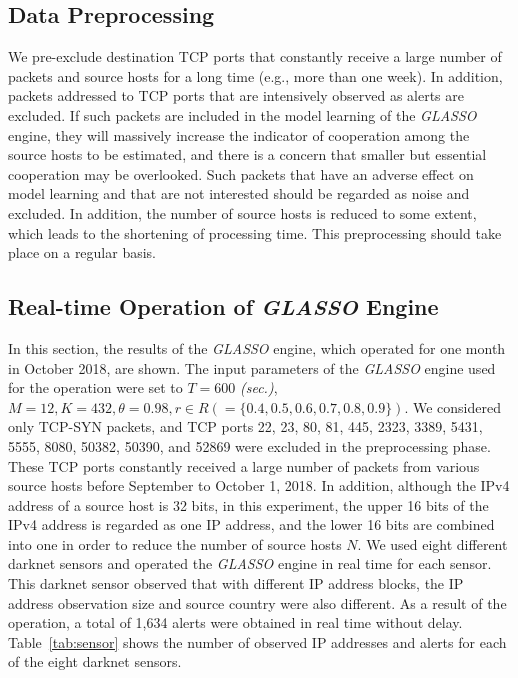 \documentclass[conference]{IEEEtran}
\begin{document}
\subsection{Data Preprocessing}
We pre-exclude destination TCP ports that constantly receive a large number of packets and source hosts for a long time (e.g., more than one week).
In addition, packets addressed to TCP ports that are intensively observed as alerts are excluded.
If such packets are included in the model learning of the \textit{GLASSO} engine, they will massively increase the indicator of cooperation among the source hosts to be estimated, and there is a concern that smaller but essential cooperation may be overlooked.
Such packets that have an adverse effect on model learning and that are not interested should be regarded as noise and excluded.
In addition, the number of source hosts is reduced to some extent, which leads to the shortening of processing time.
This preprocessing should take place on a regular basis.



\subsection{Real-time Operation of \textit{GLASSO} Engine}
\label{Operation}
In this section, the results of the \textit{GLASSO} engine, which operated for one month in October 2018, are shown.
The input parameters of the \textit{GLASSO} engine used for the operation were set to $T=600$ \textit{(sec.)}, $M=12, K=432, \theta=0.98, r \in R ( = \{0.4, 0.5, 0.6, 0.7, 0.8, 0.9\})$.
We considered only TCP-SYN packets, and TCP ports 22, 23, 80, 81, 445, 2323, 3389, 5431, 5555, 8080, 50382, 50390, and 52869 were excluded in the preprocessing phase.
These TCP ports constantly received a large number of packets from various source hosts before September to October 1, 2018.
In addition, although the IPv4 address of a source host is 32 bits, in this experiment, the upper 16 bits of the IPv4 address is regarded as one IP address, and the lower 16 bits are combined into one in order to reduce the number of source hosts $N$.
We used eight different darknet sensors and operated the \textit{GLASSO} engine in real time for each sensor.
This darknet sensor observed that with different IP address blocks, the IP address observation size and source country were also different.
As a result of the operation, a total of 1,634 alerts were obtained in real time without delay.
Table~\ref{tab:sensor} shows the number of observed IP addresses and alerts for each of the eight darknet sensors.
\end{document}
